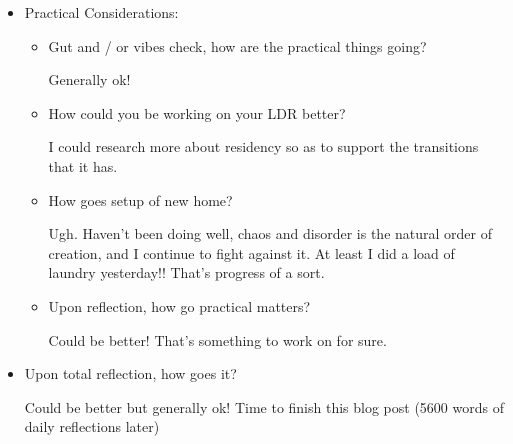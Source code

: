 \documentclass[12pt]{article}
\renewcommand{\,}{\textsuperscript{,}}
\begin{document}
\begin{itemize}
\begin{itemize}
\item Social? Wins / areas of struggle?

Been messaging people! Otherwise haven't seen a ton of people since last reflection. Was social at Pilates, as per my usual.

\item Upon reflection, how is health going?

It's going! Interesting that I didn't put mental health here, but that's probably for the best, because I don't always want to air my dirty laundry to the world.

\end{itemize}  
   
 \item Practical Considerations:  
 \begin{itemize}  
 \item Gut and / or vibes check, how are the practical things going?

Generally ok!

\item How could you be working on your LDR better?

I could research more about residency so as to support the transitions that it has.

\item How goes setup of new home?

Ugh. Haven't been doing well, chaos and disorder is the natural order of creation, and I continue to fight against it.  
At least I did a load of laundry yesterday!! That's progress of a sort.

\item Upon reflection, how go practical matters?

Could be better! That's something to work on for sure.

\end{itemize}  
 \item Upon total reflection, how goes it?

Could be better but generally ok!  
Time to finish this blog post (5600 words of daily reflections later)  
\end{itemize}  
	
\end{document}
